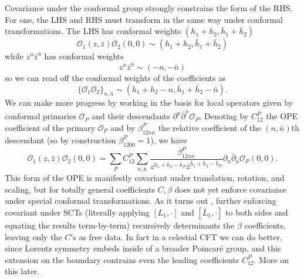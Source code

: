 \documentclass[11pt,letterpaper]{article}
\newcommand{\mc}[1]{\mathcal{#1}}
\newcommand{\D}{\partial}
\begin{document}
Covariance under the conformal group strongly constrains the form of the RHS. For one, the LHS and RHS must transform in the same way under conformal transformations. The LHS has conformal weights $(h_1 + h_2, \bar{h}_1 + \bar{h}_2)$ \begin{equation}
\mc{O}_1 (z, \bar{z})
\mc{O}_2 (0,0) \sim (h_1 + h_2, \bar{h}_1 + \bar{h}_2)
\end{equation}
while $z^n \bar{z}^{\bar{n}}$ has conformal weights \begin{equation}
z^n \bar{z}^{\bar{n}} \sim (-n, - \bar{n})
\end{equation}
so we can read off the conformal weights of the coefficients as \begin{equation}
\{\mc{O}_1 \mc{O}_2\}_{n, \bar{n}} \sim (h_1 + h_2 - n, \bar{h}_1 + \bar{h}_2 - \bar{n}).
\end{equation}
We can make more progress by working in the basis for local operators given by conformal primaries $\mc{O}_P$ and their descendants $\D^n \bar{\D}^{\bar{n}} \mc{O}_P$. Denoting by $C_{12}^P$ the OPE coefficient of the primary $\mc{O}_P$ and by $\beta_{12 n \bar{n}}^P$ the relative coefficient of the $(n, \bar{n})$th descendant (so by construction $\beta^P_{1200} = 1$), we have \begin{equation}\label{generalpairwiseOPE}
\mc{O}_1 (z, \bar{z})
\mc{O}_2 (0,0) = \sum_P C_{12}^P \sum_{n, \bar{n}} \frac{\beta^P_{12 n \bar{n}}}{z^{h_1 + h_2 - h_P} \bar{z}^{\bar{h}_1 + \bar{h}_2 - \bar{h}_P}} \D_n \bar{\D}_{\bar{n}} \mc{O}_P(0,0).
\end{equation}
This form of the OPE is manifestly covariant under translation, rotation, and scaling, but for totally general coefficients $C, \beta$ does not yet enforce covariance under special conformal transformations. As it turns out \cite{Himwich:2021dau}, further enforcing covariant under SCTs (literally applying $[L_1, \cdot]$ and $[\bar{L}_1, \cdot]$ to both sides and equating the results term-by-term) recursively determinants the $\beta$ coefficients, leaving only the $C$'s as free data. In fact in a celestial CFT we can do better, since Lorentz symmetry embeds inside of a broader Poincar\'{e} group, and this extension on the boundary contrains even the leading coefficients $C_{12}^P$. More on this later.
\end{document}
